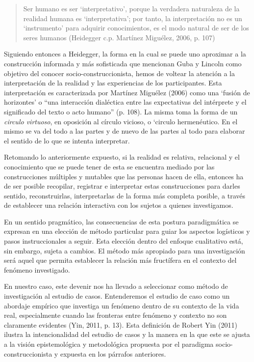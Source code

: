 \begin{quote}
    Ser humano es ser ‘interpretativo’, porque la verdadera naturaleza de la
    realidad humana es ‘interpretativa’; por tanto, la interpretación no es un
    ‘instrumento’ para adquirir conocimientos, es el modo natural de ser de los
    seres humanos (Heidegger c.p. Martínez Miguélez, 2006, p. 107)
\end{quote}

Siguiendo entonces a Heidegger, la forma en la cual se puede uno aproximar a la
construcción informada y más sofisticada que mencionan Guba y Lincoln como
objetivo del conocer socio-construccionista, hemos de voltear la atención a la
interpretación de la realidad y las experiencias de los participantes.
Esta interpretación es caracterizada por Martínez Miguélez (2006) como una
‘fusión de horizontes’ o “una interacción dialéctica entre las expectativas del
intérprete y el significado del texto o acto humano” (p. 108).
La misma toma la forma de un \emph{circulo virtuoso}, en oposición al círculo
vicioso,
o ‘circulo hermenéutico.
En el mismo se va del todo a las partes y de nuevo de las partes al todo para
elaborar el sentido de lo que se intenta interpretar.

Retomando lo anteriormente expuesto, si la realidad es relativa, relacional y el
conocimiento que se puede tener de esta se encuentra mediado por las
construcciones múltiples y mutables que las personas hacen de ella, entonces ha
de ser posible recopilar, registrar e interpretar estas construcciones para
darles sentido, reconstruirlas, interpretarlas de la forma más completa posible,
a través de establecer una relación interactiva con los sujetos a quienes
investigamos.

En un sentido pragmático, las consecuencias de esta postura paradigmática se
expresan en una elección de método particular para guiar los aspectos logísticos
y pasos instruccionales a seguir.
Esta elección dentro del enfoque cualitativo está, sin embargo, sujeta a
cambios.
El método más apropiado para una investigación será aquel que permita establecer
la relación más fructífera en el contexto del fenómeno investigado.

En nuestro caso, este devenir nos ha llevado a seleccionar como método de
investigación al estudio de casos.
Entenderemos el estudio de caso como un abordaje empírico que investiga un
fenómeno dentro de su contexto de la vida real, especialmente cuando las
fronteras entre fenómeno y contexto no son claramente evidentes (Yin, 2011, p.
13).
Esta definición de Robert Yin (2011) ilustra la intencionalidad del estudio de
casos y la manera en la que este se ajusta a la visión epistemológica y
metodológica propuesta por el paradigma socio-construccionista y expuesta en los
párrafos anteriores.

